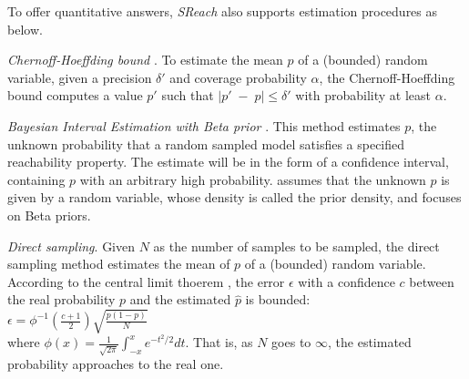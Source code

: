 To offer quantitative answers, {\it SReach} also supports estimation procedures as below.

\textit{Chernoff-Hoeffding bound} \cite{hoeffding1963probability}. To estimate the mean $p$ of a (bounded) 
random variable, given a precision $\delta'$ and coverage probability $\alpha$, the Chernoff-Hoeffding bound 
computes a value $p'$ such that $|p' \; - \; p| \le \delta'$ with probability at least $\alpha$.

\textit{Bayesian Interval Estimation with Beta prior} \cite{zuliani2010bayesian}. This method estimates $p$, the unknown probability that a random sampled model satisfies a specified reachability property. 
The estimate will be in the form of a confidence interval, containing $p$ with an arbitrary high probability.  \cite{zuliani2010bayesian} assumes that the unknown $p$ is given by a random variable, whose density is called the prior density, and focuses on Beta priors. %

\textit{Direct sampling}. Given $N$ as the number of samples to be sampled, the direct sampling method estimates the mean of $p$ of a (bounded) random variable. According to the central limit thoerem \cite{durrett2010probability}, the error $\epsilon$ with a confidence $c$ between the real probability $p$ and the estimated $\hat{p}$ is bounded: \\
$\epsilon  =  \phi^{-1}\left ( \frac{c + 1}{2} \right ) \sqrt{\frac{p(1-p)}{N}}$\\
where $\phi(x) = \frac{1}{\sqrt{2\pi}} \int_{-x}^{x} e^{-t^2 / 2}dt$. That is, as $N$ goes to $\infty$, the estimated probability approaches to the real one.
